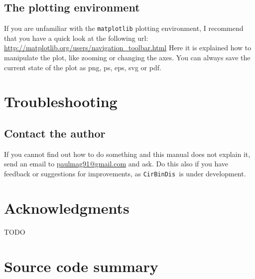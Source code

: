 \documentclass[a4paper, 12pt, english, titlepage]{article}
\newcommand{\sname}{\texttt{CirBinDis }}
\begin{document}
\subsection{The plotting environment}
    If you are unfamiliar with the \texttt{matplotlib} plotting environment, I recommend that you have a quick look at the following url: \url{http://matplotlib.org/users/navigation_toolbar.html}
    Here it is explained how to manipulate the plot, like zooming or changing the axes.
    You can always save the current state of the plot as png, ps, eps, svg or pdf.



\section{Troubleshooting}

\subsection{Contact the author}
    If you cannot find out how to do something and this manual does not explain it,
    send an email to \href{mailto:paulmag91@gmail.com}{paulmag91@gmail.com} and ask.
    Do this also if you have feedback or suggestions for improvements, as \sname is under development.




\section{Acknowledgments}
TODO


\section{Source code summary}
\end{document}
